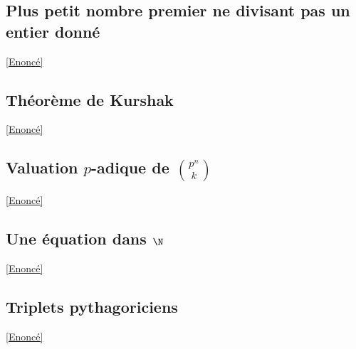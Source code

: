 \documentclass[8pt]{book}
\begin{document}
	\subsection{Plus petit nombre premier ne divisant pas un entier donné}
	\label{Plus petit nombre premier ne divisant pas un entier donné corrigé}
	\textcolor{blue}{\hyperref[Plus petit nombre premier ne divisant pas un entier donné]{[Enoncé]}}\\
	
	\subsection{Théorème de Kurshak}
	\label{Théorème de Kurshak corrigé}
	\textcolor{blue}{\hyperref[Théorème de Kurshak]{[Enoncé]}}\\
	
	\subsection{Valuation $p$-adique de $\displaystyle\binom{p^n}{k}$}
	\label{Valuation padique de binom(p^n)(k) corrigé}
	\textcolor{blue}{\hyperref[Valuation padique de binom(p^n)(k)]{[Enoncé]}}\\
	
	\subsection{Une équation dans $\N$}
	\label{Une équation dans N corrigé}
	\textcolor{blue}{\hyperref[Une équation dans N]{[Enoncé]}}\\
	
	\subsection{Triplets pythagoriciens}
	\label{Triplets pythagoriciens corrigé}
	\textcolor{blue}{\hyperref[Triplets pythagoriciens]{[Enoncé]}}\\
	
\end{document}
